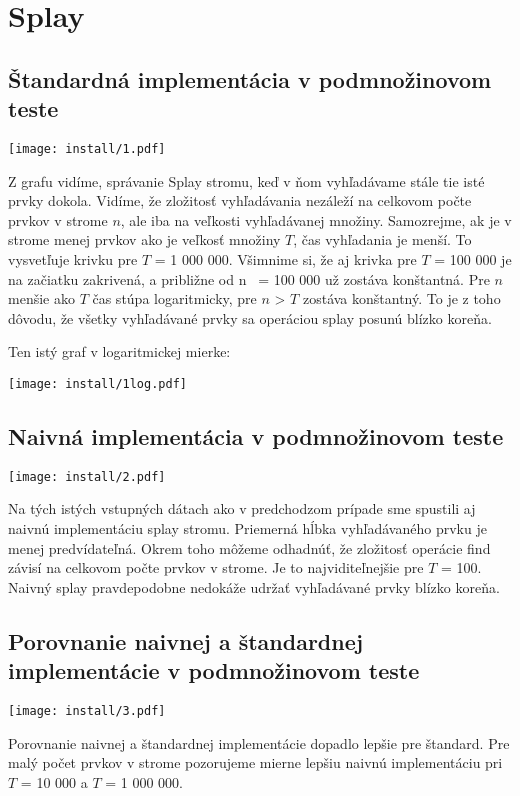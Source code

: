 \documentclass[12pt,a4paper]{article}
\title{}
\author{}
\begin{document}
	\pagestyle{empty}
\section{Splay}

\subsection{Štandardná implementácia v podmnožinovom teste}

\texttt{[image: install/1.pdf]}

Z grafu vidíme, správanie Splay stromu, keď v ňom vyhľadávame stále tie isté prvky dokola. Vidíme, že zložitosť vyhľadávania nezáleží na celkovom počte prvkov v strome $n$, ale iba na veľkosti vyhľadávanej množiny. Samozrejme, ak je v strome menej prvkov ako je veľkosť množiny $T$, čas vyhľadania je menší. To vysvetľuje krivku pre $T$ = 1 000 000. Všimnime si, že aj krivka pre $T$ = 100 000 je na začiatku zakrivená, a približne od n ~= 100 000 už zostáva konštantná. Pre $n$ menšie ako $T$ čas stúpa logaritmicky, pre $n$ > $T$ zostáva konštantný. To je z toho dôvodu, že všetky vyhľadávané prvky sa operáciou splay posunú blízko koreňa.

Ten istý graf v logaritmickej mierke:

\texttt{[image: install/1log.pdf]}

\subsection{Naivná implementácia v podmnožinovom teste}

\texttt{[image: install/2.pdf]}

Na tých istých vstupných dátach ako v predchodzom prípade sme spustili aj naivnú implementáciu splay stromu. Priemerná hĺbka vyhľadávaného prvku je menej predvídateľná. Okrem toho môžeme odhadnúť, že zložitosť operácie find závisí na celkovom počte prvkov v strome. Je to najviditeľnejšie pre $T$ = 100. Naivný splay pravdepodobne nedokáže udržať vyhľadávané prvky blízko koreňa. 

\subsection{Porovnanie naivnej a štandardnej implementácie v podmnožinovom teste}

\texttt{[image: install/3.pdf]}

Porovnanie naivnej a štandardnej implementácie dopadlo lepšie pre štandard. Pre malý počet prvkov v strome pozorujeme mierne lepšiu naivnú implementáciu pri $T$ = 10 000 a $T$ = 1 000 000.
\end{document}
